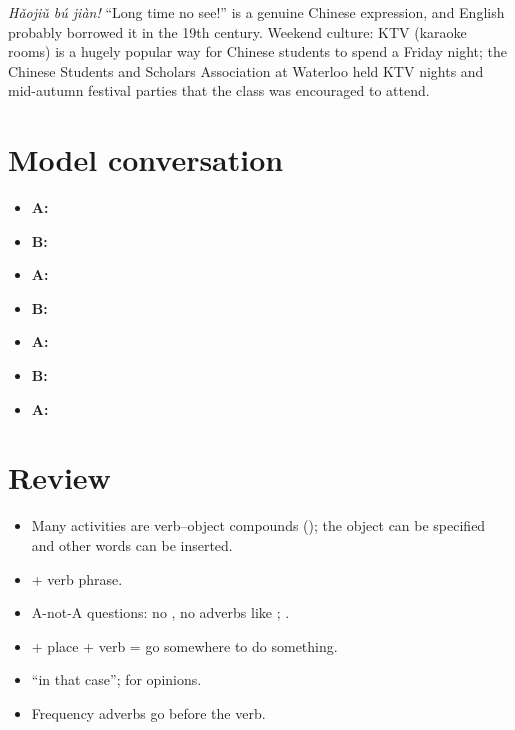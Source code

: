 \begin{aside}
 \emph{Hǎojiǔ bú jiàn!} ``Long time no see!'' is a genuine Chinese
expression, and English probably borrowed it in the 19th century.
Weekend culture: KTV (karaoke rooms) is a hugely popular way for Chinese students to
spend a Friday night; the Chinese Students and Scholars Association at Waterloo held
KTV nights and mid-autumn festival parties that the class was encouraged to attend.
\end{aside}

\section{Model conversation}

\begin{itemize}
  \item \textbf{A:} 
  \item \textbf{B:} 
  \item \textbf{A:} 
  \item \textbf{B:} 
  \item \textbf{A:} 
  \item \textbf{B:} 
  \item \textbf{A:} 
\end{itemize}

\section*{Review}
\begin{itemize}
  \item Many activities are verb--object compounds (); the object
        can be specified and other words can be inserted.
  \item {} + verb phrase.
  \item A-not-A questions: no , no adverbs like ; .
  \item {} + place + verb = go somewhere to do something.
  \item {} ``in that case'';  for opinions.
  \item Frequency adverbs go before the verb.
\end{itemize}
